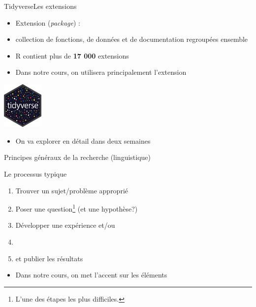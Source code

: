 \documentclass[xcolor=dvipsnames, onlymath, 10pt, aspectratio=169, handout]{beamer}
\begin{document}
\begin{frame}{Tidyverse}{Les extensions}

	\begin{itemize}
		\item Extension (\emph{package}) :
		\item[] collection de fonctions, de données et de documentation regroupées ensemble
		      \pause
		\item R contient plus de \textbf{17 000} extensions
		\item[\winner] Dans notre cours, on utilisera principalement l'extension 
	\end{itemize}

	\begin{center}
		\includegraphics[width = 0.15\textwidth]{tidyverse.png}
	\end{center}

	\begin{itemize}
		\item On va explorer en détail  dans deux semaines
	\end{itemize}

\end{frame}



\begin{transitionframe}

	Principes généraux de la recherche (linguistique)

\end{transitionframe}



\begin{frame}{Le processus typique}

	\begin{enumerate}
		\item Trouver un sujet/problème approprié
		      \pause
		\item Poser une question\footnote{L'une des étapes les plus difficiles.} (et une hypothèse?)
		      \pause
		\item Développer une expérience et/ou 
		      \pause
		\item {}
		      \pause
		\item {} et publier les résultats
	\end{enumerate}

	\vspace{3ex}

	\begin{itemize}
		\item[\winner] Dans notre cours, on met l'accent sur les éléments 
	\end{itemize}

\end{frame}
\end{document}

